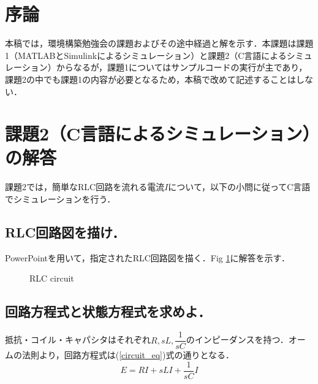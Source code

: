 \documentclass[a4paper,10pt,twocolumn,fleqn]{jarticle}
\begin{document}
{}

\section{序論}
  本稿では，環境構築勉強会の課題およびその途中経過と解を示す．本課題は課題1（MATLABとSimulinkによるシミュレーション）と課題2（C言語によるシミュレーション）からなるが，課題1についてはサンプルコードの実行が主であり，課題2の中でも課題1の内容が必要となるため，本稿で改めて記述することはしない．

\section{課題2（C言語によるシミュレーション）の解答}
  課題2では，簡単なRLC回路を流れる電流$I$について，以下の小問に従ってC言語でシミュレーションを行う．

  \subsection{RLC回路図を描け．}
    PowerPoint\textregistered を用いて，指定されたRLC回路図を描く．Fig \ref{RLC_circuit}に解答を示す．

    \begin{figure}[htbp]
      \begin{center}
        \caption{RLC circuit}
        \label{RLC_circuit}
      \end{center}
    \end{figure}

  \subsection{回路方程式と状態方程式を求めよ．}
    抵抗・コイル・キャパシタはそれぞれ$R, sL, \dfrac{1}{sC}$のインピーダンスを持つ．オームの法則より，回路方程式は(\ref{circuit_eq})式の通りとなる．
    \begin{equation}
      \label{circuit_eq}
      E = RI + sLI + \frac{1}{sC} I
    \end{equation}
\end{document}
